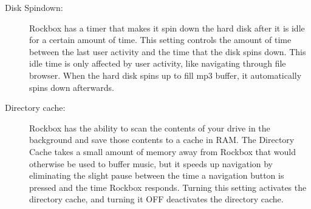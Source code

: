   \begin{description}
    \item [Disk Spindown: ]Rockbox has a timer that makes it spin down the
      hard disk after it is idle for a certain amount of time. This setting
      controls the amount of time between the last user activity and the time
      that the disk spins down. This idle time is only affected by user
      activity, like navigating through file browser. When the hard disk spins
      up to fill mp3 buffer, it automatically spins down afterwards.
    \item [Directory cache: ]Rockbox has the ability to scan the contents of
      your drive in the background and save those contents to a cache in RAM.
      The Directory Cache takes a small amount of memory away from Rockbox
      that would otherwise be used to buffer music, but it speeds up navigation
      by eliminating the slight pause between the time a navigation button is
      pressed and the time Rockbox responds.  Turning this setting 
      activates the directory cache, and turning it OFF deactivates the 
      directory cache.
  \end{description}


